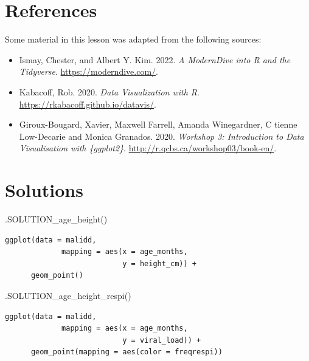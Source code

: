 \documentclass[
  letterpaper,
  DIV=11,
  numbers=noendperiod]{scrreprt}
\newenvironment{Shaded}{\begin{snugshade}}{\end{snugshade}}
\newcommand{\FunctionTok}[1]{\textcolor[rgb]{0.28,0.35,0.67}{#1}}
\newcommand{\NormalTok}[1]{\textcolor[rgb]{0.00,0.23,0.31}{#1}}
\providecommand{\tightlist}{%
  \setlength{\itemsep}{0pt}\setlength{\parskip}{0pt}}\usepackage{longtable,booktabs,array}
\begin{document}
\section*{References}\label{references-13}


Some material in this lesson was adapted from the following sources:

\begin{itemize}
\tightlist
\item
  Ismay, Chester, and Albert Y. Kim. 2022. \emph{A ModernDive into R and
  the Tidyverse}. \url{https://moderndive.com/}.
\item
  Kabacoff, Rob. 2020. \emph{Data Visualization with R}.
  \url{https://rkabacoff.github.io/datavis/}.
\item
  Giroux-Bougard, Xavier, Maxwell Farrell, Amanda Winegardner, C tienne
  Low-Decarie and Monica Granados. 2020. \emph{Workshop 3: Introduction
  to Data Visualisation with \{ggplot2\}}.
  \url{http://r.qcbs.ca/workshop03/book-en/}.
\end{itemize}

\section{Solutions}\label{solutions-10}

\begin{Shaded}
\begin{Highlighting}[]
\FunctionTok{.SOLUTION\_age\_height}\NormalTok{()}
\end{Highlighting}
\end{Shaded}

\begin{verbatim}
ggplot(data = malidd,
             mapping = aes(x = age_months, 
                           y = height_cm)) +
      geom_point()
\end{verbatim}

\begin{Shaded}
\begin{Highlighting}[]
\FunctionTok{.SOLUTION\_age\_height\_respi}\NormalTok{()}
\end{Highlighting}
\end{Shaded}

\begin{verbatim}
ggplot(data = malidd, 
             mapping = aes(x = age_months, 
                           y = viral_load)) + 
      geom_point(mapping = aes(color = freqrespi))
\end{verbatim}
\end{document}
